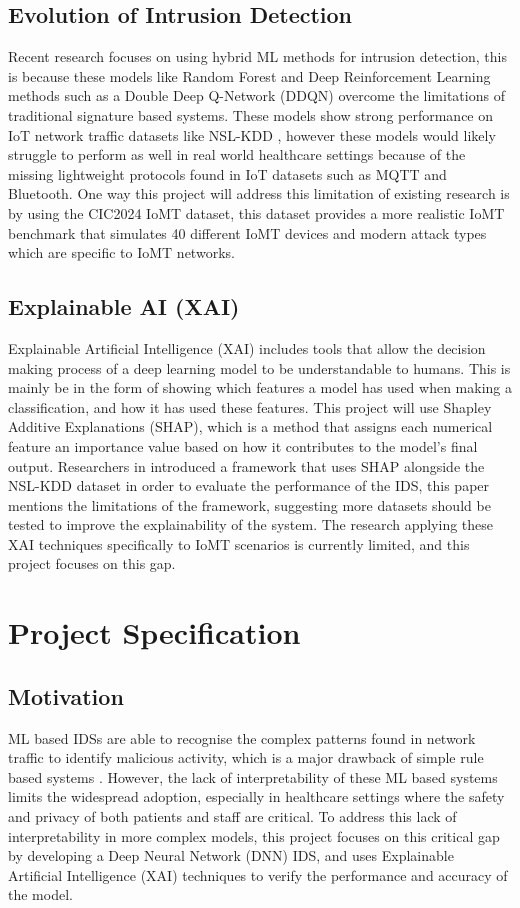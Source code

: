 \documentclass[11pt,a4paper]{article}
\begin{document}
\subsection{Evolution of Intrusion Detection}
Recent research focuses on using hybrid ML methods for intrusion detection, this is because these models like Random Forest and Deep Reinforcement Learning methods such as a Double Deep Q-Network (DDQN) \cite{da2019internet,lopez2020application} overcome the limitations of traditional signature based systems. These models show strong performance on IoT network traffic datasets like NSL-KDD \cite{nslkdddataset}, however these models would likely struggle to perform as well in real world healthcare settings because of the missing lightweight protocols found in IoT datasets such as MQTT and Bluetooth. One way this project will address this limitation of existing research is by using the CIC2024 IoMT dataset, this dataset provides a more realistic IoMT benchmark that simulates 40 different IoMT devices and modern attack types which are specific to IoMT networks.

\subsection{Explainable AI (XAI)}
Explainable Artificial Intelligence (XAI) includes tools that allow the decision making process of a deep learning model to be understandable to humans. This is mainly be in the form of showing which features a model has used when making a classification, and how it has used these features. This project will use Shapley Additive Explanations (SHAP), which is a method that assigns each numerical feature an importance value based on how it contributes to the model’s final output. Researchers in \cite{wang2020explainable} introduced a framework that uses SHAP alongside the NSL-KDD dataset \cite{nslkdddataset} in order to evaluate the performance of the IDS, this paper mentions the limitations of the framework, suggesting more datasets should be tested to improve the explainability of the system. The research applying these XAI techniques specifically to IoMT scenarios is currently limited, and this project focuses on this gap.

\section{Project Specification}
\subsection{Motivation}
ML based IDSs are able to recognise the complex patterns found in network traffic to identify malicious activity, which is a major drawback of simple rule based systems \cite{fidelisecurity}. However, the lack of interpretability of these ML based systems limits the widespread adoption, especially in healthcare settings where the safety and privacy of both patients and staff are critical. To address this lack of interpretability in more complex models, this project focuses on this critical gap by developing a Deep Neural Network (DNN) IDS, and uses Explainable Artificial Intelligence (XAI) techniques to verify the performance and accuracy of the model.
\end{document}
